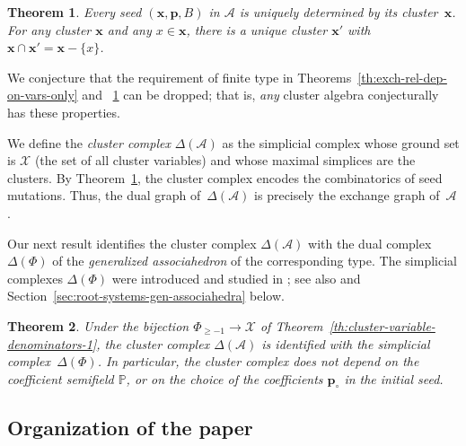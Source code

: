 \documentclass[letterpaper]{amsart}
\numberwithin{equation}{section}
\newtheorem{theorem}{Theorem}[section]
\theoremstyle{definition}
\def\AA{\mathcal{A}}
\def\PP{\mathbb{P}}
\def\xx{\mathbf{x}}
\def\pp{\mathbf{p}}
\begin{document}
\begin{theorem} 
\label{th:pseudomanifold-clusters} 
Every seed $(\xx,\pp,B)$ in $\AA$ 
is uniquely determined by its cluster~$\xx$. 
For any cluster $\xx$ and any %
$x\in\xx$, 
there is a unique cluster $\xx'$ with $\xx\cap\xx'=\xx-\{x\}$. 
\end{theorem} 
 
We conjecture that the requirement of finite type 
in Theorems~\ref{th:exch-rel-dep-on-vars-only} 
and~ \ref{th:pseudomanifold-clusters} 
can be dropped; that is, \emph{any} cluster algebra conjecturally has 
these properties. 
 
We define the \emph{cluster complex} $\Delta(\AA)$  as the simplicial 
complex whose ground set is $\mathcal{X}$ 
(the set of all cluster variables) and whose maximal 
simplices are the clusters. 
By Theorem~\ref{th:pseudomanifold-clusters}, 
the cluster complex encodes the combinatorics of seed mutations. 
Thus, the dual graph of~$\Delta(\AA)$ is precisely the exchange 
graph of~$\AA$. 
 
Our next result identifies the cluster complex 
$\Delta(\AA)$ with the dual complex $\Delta(\Phi)$ of the 
\emph{generalized associahedron} of the corresponding type. 
The simplicial complexes $\Delta(\Phi)$ were introduced  and 
studied in \cite{yga}; see also \cite{cfz} and 
Section~\ref{sec:root-systems-gen-associahedra}  below. 
 
 
\begin{theorem} 
\label{th:finite-type-complex} 
Under the bijection 
\hbox{$\Phi_{\geq -1}\to\mathcal{X}$} 
of Theorem~\ref{th:cluster-variable-denominators-1}, 
the cluster complex $\Delta(\AA)$ is  identified 
with the %
simplicial complex~$\Delta(\Phi)$. %
In particular, the cluster complex does not depend on the coefficient 
semifield $\PP$, 
or on the choice of the coefficients $\pp_\circ$ in the initial seed. 
\end{theorem} 
 
 
\subsection{Organization of the paper} 
\label{sec:organization-ca2} 
 
\end{document}
